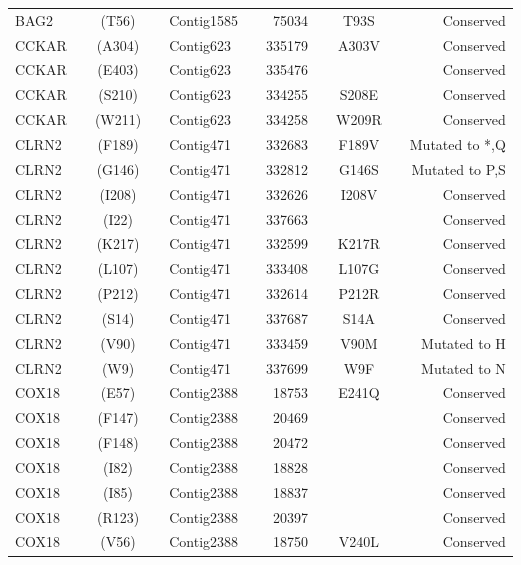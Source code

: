 \begin{center}
\begin{longtable}{lccclcrcccr}
BAG2     & & (T56)   & & Contig1585 & & 75034    & & T93S    & & Conserved      \\
CCKAR    & & (A304)  & & Contig623  & & 335179   & & A303V   & & Conserved      \\
CCKAR    & & (E403)  & & Contig623  & & 335476   & &         & & Conserved      \\
CCKAR    & & (S210)  & & Contig623  & & 334255   & & S208E   & & Conserved      \\
CCKAR    & & (W211)  & & Contig623  & & 334258   & & W209R   & & Conserved      \\
CLRN2    & & (F189)  & & Contig471  & & 332683   & & F189V   & & Mutated to *,Q \\
CLRN2    & & (G146)  & & Contig471  & & 332812   & & G146S   & & Mutated to P,S \\
CLRN2    & & (I208)  & & Contig471  & & 332626   & & I208V   & & Conserved      \\
CLRN2    & & (I22)   & & Contig471  & & 337663   & &         & & Conserved      \\
CLRN2    & & (K217)  & & Contig471  & & 332599   & & K217R   & & Conserved      \\
CLRN2    & & (L107)  & & Contig471  & & 333408   & & L107G   & & Conserved      \\
CLRN2    & & (P212)  & & Contig471  & & 332614   & & P212R   & & Conserved      \\
CLRN2    & & (S14)   & & Contig471  & & 337687   & & S14A    & & Conserved      \\
CLRN2    & & (V90)   & & Contig471  & & 333459   & & V90M    & & Mutated to H   \\
CLRN2    & & (W9)    & & Contig471  & & 337699   & & W9F     & & Mutated to N   \\
COX18    & & (E57)   & & Contig2388 & & 18753    & & E241Q   & & Conserved      \\
COX18    & & (F147)  & & Contig2388 & & 20469    & &         & & Conserved      \\
COX18    & & (F148)  & & Contig2388 & & 20472    & &         & & Conserved      \\
COX18    & & (I82)   & & Contig2388 & & 18828    & &         & & Conserved      \\
COX18    & & (I85)   & & Contig2388 & & 18837    & &         & & Conserved      \\
COX18    & & (R123)  & & Contig2388 & & 20397    & &         & & Conserved      \\
COX18    & & (V56)   & & Contig2388 & & 18750    & & V240L   & & Conserved      \\

\end{longtable}
\end{center}
